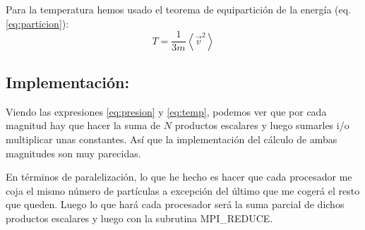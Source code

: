 Para la temperatura hemos usado el teorema de equipartición de la energía (eq. \ref{eq:particion}):
\begin{equation}
T = \frac{1}{3m} \left\langle \vec{v}^2 \right\rangle
\label{eq:temp}
\end{equation}

\subsection{Implementación:}
Viendo las expresiones \ref{eq:presion} y \ref{eq:temp}, podemos ver que por cada magnitud hay que hacer la suma de $N$ productos escalares y luego sumarles i/o multiplicar unas constantes. Así que la implementación del cálculo de ambas magnitudes son muy parecidas.

En términos de paralelización, lo que he hecho es hacer que cada procesador me coja el mismo número de partículas a excepción del último que me cogerá el resto que queden. Luego lo que hará cada procesador será la suma parcial de dichos productos escalares y luego con la subrutina \textsf{MPI\_REDUCE}.

